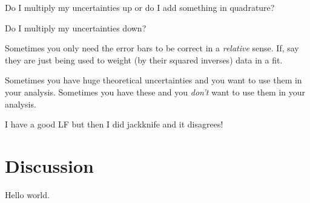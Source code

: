 \documentclass[10pt]{article}
\begin{document}
Do I multiply my uncertainties up or do I add something in quadrature?

Do I multiply my uncertainties down?

Sometimes you only need the error bars to be correct in a
\emph{relative} sense. If, say they are just being used to weight (by
their squared inverses) data in a fit.

Sometimes you have huge theoretical uncertainties and you want to use
them in your analysis. Sometimes you have these and you \emph{don't} want
to use them in your analysis.

I have a good LF but then I did jackknife and it disagrees!

\section{Discussion}

Hello world.

\clearpage\raggedright

\end{document}
